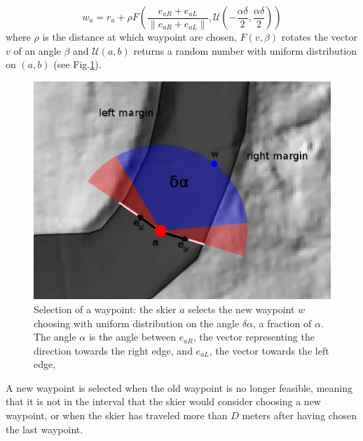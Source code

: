 \documentclass[12pt,a4paper,twoside]{book}
\newcommand{\norm}[1]{\lVert#1\rVert}
\begin{document}
\begin{equation}\label{new_waypoint}
w_a=r_a+\rho F\left(\frac{e_{aR}+e_{aL}}{\norm{e_{aR}+e_{aL}}},\mathcal{U}\left(-\frac{\alpha\delta}{2},\frac{\alpha\delta}{2}\right)\right)
\end{equation}
where $\rho$ is the distance at which waypoint are chosen, $F\left(v,\beta\right)$ rotates the vector $v$ of an angle $\beta$ and $\mathcal{U}(a,b)$ returns a random number with uniform distribution on $(a,b)$ (see Fig.\ref{new_waypoint_pic}).

\begin{figure}[!ht]
  \begin{center}
    \includegraphics[width=\textwidth]{images/waypoint_new.eps}
    \caption{Selection of a waypoint: the skier $a$ selects the new waypoint $w$ choosing with uniform distribution on the angle $\delta\alpha$, a fraction of $\alpha$. The angle $\alpha$ is the angle between $e_{aR}$, the vector representing the direction towards the right edge, and $e_{aL}$, the vector towards the left edge,}\label{new_waypoint_pic}
  \end{center}
\end{figure}

A new waypoint is selected when the old waypoint is no longer feasible, meaning that it is not in the interval that the skier would consider choosing a new waypoint, or when the skier has traveled more than $D$ meters after having chosen the last waypoint.
\end{document}
